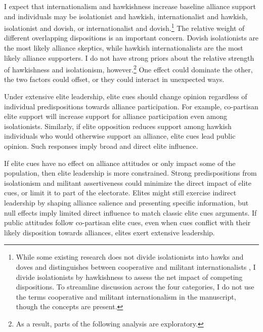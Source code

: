 \documentclass[12pt]{article}
\begin{document}
I expect that internationalism and hawkishness increase baseline alliance support and individuals may be isolationist and hawkish, internationalist and hawkish, isolationist and dovish, or internationalist and dovish.\footnote{While some existing research does not divide isolationists into hawks and doves and distinguishes between cooperative and militant internationalists \citep{Kertzeretal2014}, I divide isolationists by hawkishness to assess the net impact of competing dispositions. To streamline discussion across the four categories, I do not use the terms cooperative and militant internationalism in the manuscript, though the concepts are present.}   
The relative weight of different overlapping dispositions is an important concern.
Dovish isolationists are the most likely alliance skeptics, while hawkish internationalists are the most likely alliance supporters. 
I do not have strong priors about the relative strength of hawkishness and isolationism, however.\footnote{As a result, parts of the following analysis are exploratory.}
One effect could dominate the other, the two factors could offset, or they could interact in unexpected ways.




Under extensive elite leadership, elite cues should change opinion regardless of individual predispositions towards alliance participation. 
For example, co-partisan elite support will increase support for alliance participation even among isolationists. 
Similarly, if elite opposition reduces support among hawkish individuals who would otherwise support an alliance, elite cues lead public opinion. 
Such responses imply broad and direct elite influence. 


If elite cues have no effect on alliance attitudes or only impact some of the population, then elite leadership is more constrained.
Strong predispositions from isolationism and militant assertiveness could minimize the direct impact of elite cues, or limit it to part of the electorate.
Elites might still exercise indirect leadership by shaping alliance salience and presenting specific information, but null effects imply limited direct influence to match classic elite cues arguments. 
If public attitudes follow co-partisan elite cues, even when cues conflict with their likely disposition towards alliances, elites exert extensive leadership. 
\end{document}
